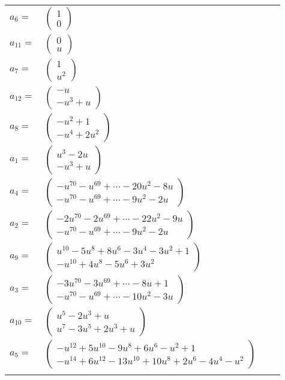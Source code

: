 \documentclass[1p]{elsarticle_modified}
\theoremstyle{definition}
\begin{document}
\begin{tabular}{m{7pt} m{180pt} m{7pt} m{180pt} }
\flushright $a_{6}=$&$\begin{pmatrix}1\\0\end{pmatrix}$ \\
\flushright $a_{11}=$&$\begin{pmatrix}0\\u\end{pmatrix}$ \\
\flushright $a_{7}=$&$\begin{pmatrix}1\\u^2\end{pmatrix}$ \\
\flushright $a_{12}=$&$\begin{pmatrix}- u\\- u^3+u\end{pmatrix}$ \\
\flushright $a_{8}=$&$\begin{pmatrix}- u^2+1\\- u^4+2 u^2\end{pmatrix}$ \\
\flushright $a_{1}=$&$\begin{pmatrix}u^3-2 u\\- u^3+u\end{pmatrix}$ \\
\flushright $a_{4}=$&$\begin{pmatrix}- u^{70}- u^{69}+\cdots-20 u^2-8 u\\- u^{70}- u^{69}+\cdots-9 u^2-2 u\end{pmatrix}$ \\
\flushright $a_{2}=$&$\begin{pmatrix}-2 u^{70}-2 u^{69}+\cdots-22 u^2-9 u\\- u^{70}- u^{69}+\cdots-9 u^2-2 u\end{pmatrix}$ \\
\flushright $a_{9}=$&$\begin{pmatrix}u^{10}-5 u^8+8 u^6-3 u^4-3 u^2+1\\- u^{10}+4 u^8-5 u^6+3 u^2\end{pmatrix}$ \\
\flushright $a_{3}=$&$\begin{pmatrix}-3 u^{70}-3 u^{69}+\cdots-8 u+1\\- u^{70}- u^{69}+\cdots-10 u^2-3 u\end{pmatrix}$ \\
\flushright $a_{10}=$&$\begin{pmatrix}u^5-2 u^3+u\\u^7-3 u^5+2 u^3+u\end{pmatrix}$ \\
\flushright $a_{5}=$&$\begin{pmatrix}- u^{12}+5 u^{10}-9 u^8+6 u^6- u^2+1\\- u^{14}+6 u^{12}-13 u^{10}+10 u^8+2 u^6-4 u^4- u^2\end{pmatrix}$\\&\end{tabular}
\end{document}
